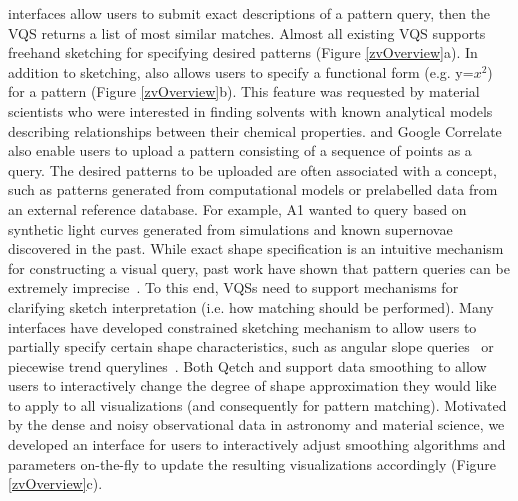  interfaces allow users to submit exact descriptions of a pattern query, then the VQS returns a list of most similar matches. Almost all existing VQS supports freehand sketching for specifying desired patterns (Figure \ref{zvOverview}a). In addition to sketching, \zv also allows users to specify a functional form (e.g. y=$x^2$) for a pattern (Figure \ref{zvOverview}b). This feature was requested by material scientists who were interested in finding solvents with known analytical models describing relationships between their chemical properties. \zv and Google Correlate also enable users to upload a pattern consisting of a sequence of points as a query. The desired patterns to be uploaded are often associated with a concept, such as patterns generated from computational models or prelabelled data from an external reference database. For example, A1 wanted to query based on synthetic light curves generated from simulations and known supernovae discovered in the past.
 While exact shape specification is an intuitive mechanism for constructing a visual query, past work have shown that pattern queries can be extremely imprecise~\cite{correll2016semantics,Holz2009,Eichmann2015}. To this end, VQSs need to support mechanisms for clarifying sketch interpretation (i.e. how matching should be performed). Many interfaces have developed constrained sketching mechanism to allow users to partially specify certain shape characteristics, such as angular slope queries~\cite{Hochheiser2004} or piecewise trend querylines~\cite{ryall2005querylines}. Both Qetch and \zv support data smoothing to allow users to interactively change the degree of shape approximation they would like to apply to all visualizations (and consequently for pattern matching). Motivated by the dense and noisy observational data in astronomy and material science, we developed an interface for users to interactively adjust smoothing algorithms and parameters on-the-fly to update the resulting visualizations accordingly (Figure \ref{zvOverview}c).
